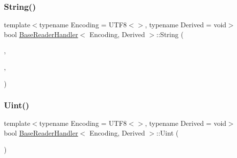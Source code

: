 \mbox{\label{structBaseReaderHandler_a3ac69e6326d0aeef7b1f2619742bbe00}} 
\subsubsection{\texorpdfstring{String()}{String()}}
{\footnotesize\ttfamily template$<$typename Encoding = U\+T\+F8$<$$>$, typename Derived = void$>$ \\
bool \hyperlink{structBaseReaderHandler}{Base\+Reader\+Handler}$<$ Encoding, Derived $>$\+::String (\begin{DoxyParamCaption}\item[{const \hyperlink{structBaseReaderHandler_a8302c755dd3560c8c5bac99162c28214}{Ch} $\ast$}]{,  }\item[{\hyperlink{rapidjson_8h_a5ed6e6e67250fadbd041127e6386dcb5}{Size\+Type}}]{,  }\item[{bool}]{ }\end{DoxyParamCaption})\hspace{0.3cm}{\ttfamily [inline]}}

\mbox{\label{structBaseReaderHandler_a0e683306cbb7b4e350a35c18c5246f2a}} 
\subsubsection{\texorpdfstring{Uint()}{Uint()}}
{\footnotesize\ttfamily template$<$typename Encoding = U\+T\+F8$<$$>$, typename Derived = void$>$ \\
bool \hyperlink{structBaseReaderHandler}{Base\+Reader\+Handler}$<$ Encoding, Derived $>$\+::Uint (\begin{DoxyParamCaption}\item[{unsigned}]{ }\end{DoxyParamCaption})\hspace{0.3cm}{\ttfamily [inline]}}

\mbox{\label{structBaseReaderHandler_a351aa3cd81856a487c21022e9cc64d2b}} 
